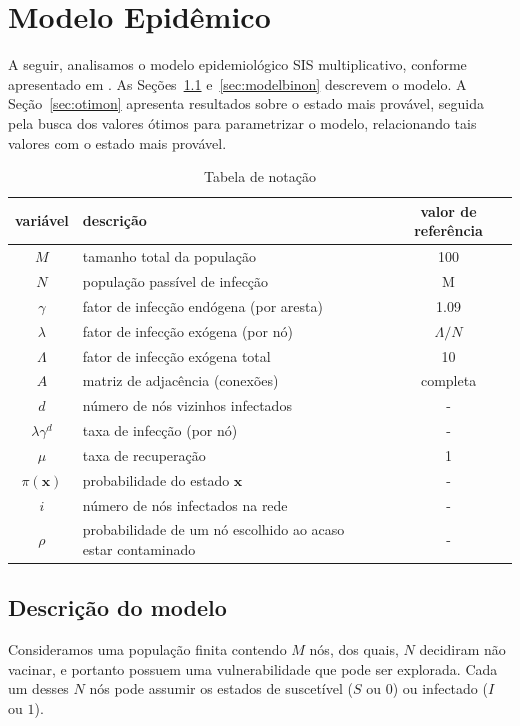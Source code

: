 
\chapter{Modelo Epidêmico}
\label{cap:modelo_epidemico}
    A seguir, analisamos o modelo epidemiológico SIS multiplicativo, conforme apresentado em \cite{rufino2018contaminaccao}.  As Seções~\ref{sec:descrmodel} e~\ref{sec:modelbinon} descrevem o  modelo.  
    A Seção~\ref{sec:otimon} apresenta resultados sobre o estado mais provável, seguida pela  busca dos valores ótimos para parametrizar o modelo, relacionando tais valores com o estado mais provável.

	\begin{table}[!htb]
	\footnotesize
		\centering 
			\caption{Tabela de notação}
		\begin{tabular}{clc}
			\hline
			variável 		& descrição 								& valor de referência \\ 
			\hline
			$M$ 			& tamanho total da população 				& 100 \\
			$N$ 			& população passível de infecção 			& M\\
			$\gamma$ 		&  fator de infecção endógena (por aresta) 	& 1.09 \\
			$\lambda$ 		&  fator de infecção exógena (por nó) 		& $\Lambda/N$ \\ 
			$\Lambda$ 		& fator de infecção exógena total 			& 10 \\
			$A$ 			& matriz de adjacência (conexões) 			& completa \\
			$d$ 			& número de nós vizinhos infectados 		& - \\
			$\lambda \gamma^d$ &  taxa de infecção (por nó)  			& - \\
			$\mu$ 			& taxa de recuperação 						& 1 \\
			$\pi(\bm{x})$ 	& probabilidade do estado $\bm{x} $			& - \\
			$i$  			& número de nós infectados na rede 			& - \\
			$\rho$ 			& probabilidade de um nó escolhido ao acaso estar contaminado & - \\
			\hline
		\end{tabular}
 	\label{tab:notation}
	\end{table}
	
    \section{Descrição do modelo}  
    \label{sec:descrmodel}
    	Consideramos uma população finita contendo $M$ nós, dos quais, $N$ decidiram não vacinar, e portanto possuem uma vulnerabilidade que pode ser explorada.	Cada um desses $N$ nós pode assumir os estados de suscetível ($S$ ou $0$) ou infectado ($I$ ou $1$). 
    	
